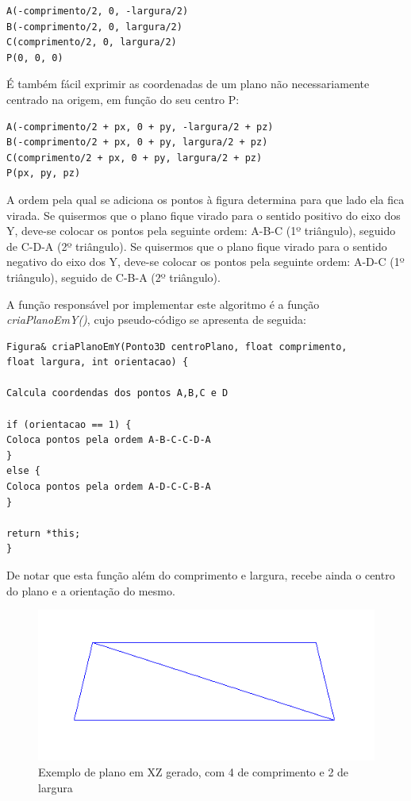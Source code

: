 \begin{Verbatim}
A(-comprimento/2, 0, -largura/2)
B(-comprimento/2, 0, largura/2)
C(comprimento/2, 0, largura/2)
P(0, 0, 0)
\end{Verbatim}

É também fácil exprimir as coordenadas de um plano não necessariamente centrado na origem, em função do seu centro P:

\begin{Verbatim}
A(-comprimento/2 + px, 0 + py, -largura/2 + pz)
B(-comprimento/2 + px, 0 + py, largura/2 + pz)
C(comprimento/2 + px, 0 + py, largura/2 + pz)
P(px, py, pz)
\end{Verbatim}

A ordem pela qual se adiciona os pontos à figura determina para que lado ela fica virada. Se quisermos que o plano fique virado para o sentido positivo do eixo dos Y, deve-se colocar os pontos pela seguinte ordem: A-B-C (1º triângulo), seguido de C-D-A (2º triângulo). Se quisermos que o plano fique virado para o sentido negativo do eixo dos Y, deve-se colocar os pontos pela seguinte ordem: A-D-C (1º triângulo), seguido de C-B-A (2º triângulo).

A função responsável por implementar este algoritmo é a função \textit{criaPlanoEmY()}, cujo pseudo-código se apresenta de seguida:

\begin{Verbatim}
Figura& criaPlanoEmY(Ponto3D centroPlano, float comprimento, 
float largura, int orientacao) {

Calcula coordendas dos pontos A,B,C e D

if (orientacao == 1) {
Coloca pontos pela ordem A-B-C-C-D-A
}
else {
Coloca pontos pela ordem A-D-C-C-B-A
}

return *this;
}
\end{Verbatim}

De notar que esta função além do comprimento e largura, recebe ainda o centro do plano e a orientação do mesmo.

\begin{figure}[<+htpb+>]
	\centering
	\includegraphics[scale=0.5]{imagens/p3_plano_4_2.png}
	\caption{Exemplo de plano em XZ gerado, com 4 de comprimento e 2 de largura}
	\label{p1:fig:p3_plano_4_2}
\end{figure}

